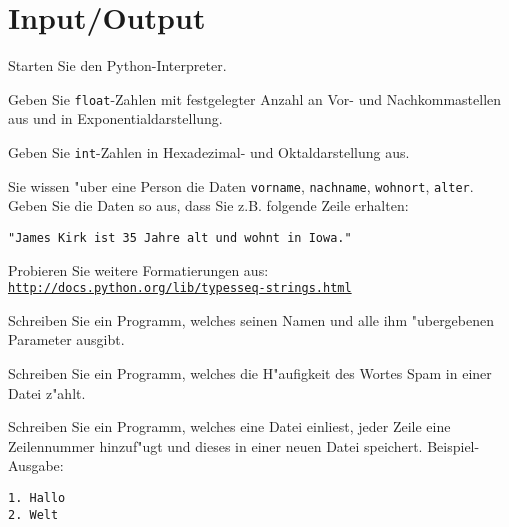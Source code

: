 \section*{Input/Output}
\begin{aufgabe}
Starten Sie den Python-Interpreter. 
\begin{auflistung}
\item Geben Sie \lstinline{float}-Zahlen mit festgelegter Anzahl an Vor- und Nachkommastellen aus und in Exponentialdarstellung.
\item Geben Sie \lstinline{int}-Zahlen in Hexadezimal- und Oktaldarstellung aus.
\item Sie wissen "uber eine Person die Daten \lstinline{vorname}, \lstinline{nachname}, \lstinline{wohnort}, \lstinline{alter}. Geben Sie die Daten so aus, dass Sie z.B. folgende Zeile erhalten: 
\begin{verbatim}
"James Kirk ist 35 Jahre alt und wohnt in Iowa."
\end{verbatim}
\item Probieren Sie weitere Formatierungen aus:\\ \texttt{\underline{http://docs.python.org/lib/typesseq-strings.html}}
\end{auflistung}
\end{aufgabe}

\begin{aufgabe}[Kommandozeilenparameter]
Schreiben Sie ein Programm, welches seinen Namen und alle ihm "ubergebenen Parameter ausgibt.
\end{aufgabe}

\begin{aufgabe}
Schreiben Sie ein Programm, welches die H"aufigkeit des Wortes \glqq Spam\grqq{} in einer Datei z"ahlt. 
\end{aufgabe}

\begin{aufgabe}
Schreiben Sie ein Programm, welches eine Datei einliest, jeder Zeile eine Zeilennummer hinzuf"ugt und dieses in einer neuen Datei speichert. Beispiel-Ausgabe:
\begin{verbatim}
1. Hallo
2. Welt
\end{verbatim}

\end{aufgabe}


